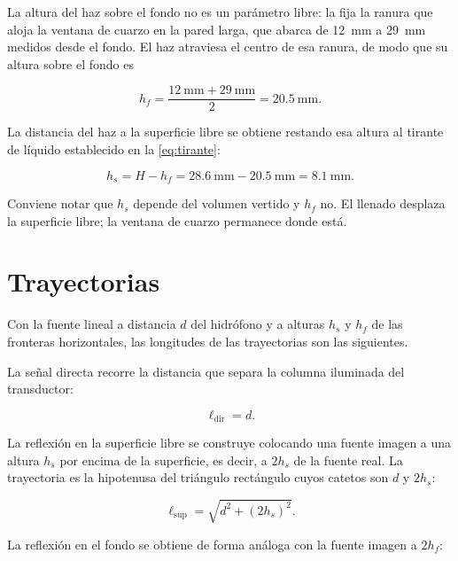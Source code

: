 La altura del haz sobre el fondo no es un parámetro libre: la fija la
ranura que aloja la ventana de cuarzo en la pared larga, que abarca de
\SI{12}{\milli\meter} a \SI{29}{\milli\meter} medidos desde el fondo.
El haz atraviesa el centro de esa ranura, de modo que su altura sobre
el fondo es

\begin{equation}
    h_f = \frac{\SI{12}{\milli\meter} + \SI{29}{\milli\meter}}{2}
        = \SI{20.5}{\milli\meter}.
    \label{eq:altura_haz}
\end{equation}

La distancia del haz a la superficie libre se obtiene restando esa
altura al tirante de líquido establecido en la \cref{eq:tirante}:

\begin{equation}
    h_s = H - h_f = \SI{28.6}{\milli\meter} - \SI{20.5}{\milli\meter}
        = \SI{8.1}{\milli\meter}.
    \label{eq:altura_superficie}
\end{equation}

Conviene notar que $h_s$ depende del volumen vertido y $h_f$ no. El
llenado desplaza la superficie libre; la ventana de cuarzo permanece
donde está.

\section*{Trayectorias}

Con la fuente lineal a distancia $d$ del hidrófono y a alturas $h_s$ y
$h_f$ de las fronteras horizontales, las longitudes de las
trayectorias son las siguientes.

La señal directa recorre la distancia que separa la columna iluminada
del transductor:

\begin{equation}
    \ell_{\text{dir}} = d.
    \label{eq:traj_directa}
\end{equation}

La reflexión en la superficie libre se construye colocando una fuente
imagen a una altura $h_s$ por encima de la superficie, es decir, a
$2h_s$ de la fuente real. La trayectoria es la hipotenusa del triángulo
rectángulo cuyos catetos son $d$ y $2h_s$:

\begin{equation}
    \ell_{\text{sup}} = \sqrt{d^{2} + (2h_s)^{2}}.
    \label{eq:traj_superficie}
\end{equation}

La reflexión en el fondo se obtiene de forma análoga con la fuente
imagen a $2h_f$:

